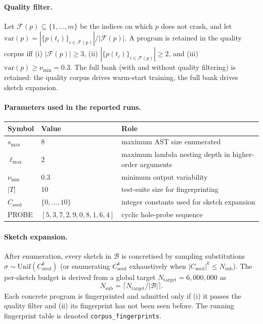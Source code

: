 \documentclass[12pt]{article}
\begin{document}
\paragraph{Quality filter.} Let $\mathcal{F}(p) \subseteq \{1,\ldots,m\}$ be the indices on which $p$ does not crash, and let $\mathrm{var}(p) = |\{p(t_i)\}_{i\in \mathcal{F}(p)}| / |\mathcal{F}(p)|$. A program is retained in the quality corpus iff (i) $|\mathcal{F}(p)| \geq 3$, (ii) $|\{p(t_i)\}_{i\in \mathcal{F}(p)}| \geq 2$, and (iii) $\mathrm{var}(p) \geq \nu_{\min} = 0.3$. The full bank (with and without quality filtering) is retained: the quality corpus drives warm-start training, the full bank drives sketch expansion.

\paragraph{Parameters used in the reported runs.}

\begin{center}
\small
\begin{tabular}{lll}
\toprule
Symbol & Value & Role \\
\midrule
$s_{\max}$       & $8$        & maximum AST size enumerated \\
$\ell_{\max}$    & $2$        & maximum lambda nesting depth in higher-order arguments \\
$\nu_{\min}$     & $0.3$      & minimum output variability \\
$|T|$            & $10$       & test-suite size for fingerprinting \\
$C_{\mathrm{seed}}$ & $\{0,\ldots,10\}$ & integer constants used for sketch expansion \\
PROBE            & $[5,3,7,2,9,0,8,1,6,4]$ & cyclic hole-probe sequence \\
\bottomrule
\end{tabular}
\end{center}

\paragraph{Sketch expansion.} After enumeration, every sketch in $\mathcal{B}$ is concretised by sampling substitutions $\sigma \sim \mathrm{Unif}(C_{\mathrm{seed}}^k)$ (or enumerating $C_{\mathrm{seed}}^k$ exhaustively when $|C_{\mathrm{seed}}|^k \leq N_{\mathrm{sub}}$). The per-sketch budget is derived from a global target $N_{\mathrm{target}} = 6{,}000{,}000$ as
\[
  N_{\mathrm{sub}} = \lceil N_{\mathrm{target}} / |\mathcal{B}|\rceil.
\]
Each concrete program is fingerprinted and admitted only if (i) it passes the quality filter and (ii) its fingerprint has not been seen before. The running fingerprint table is denoted \texttt{corpus\_fingerprints}.
\end{document}
